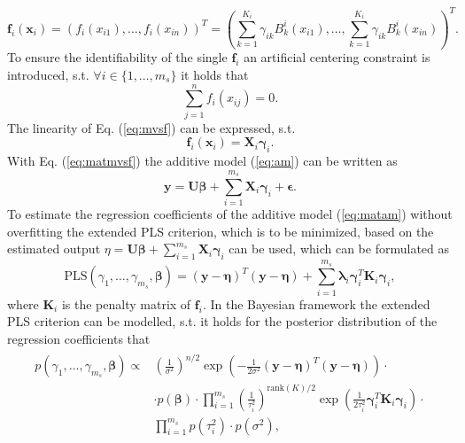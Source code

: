 \documentclass[12pt,letterpaper]{article}
\begin{document}
\begin{equation}
\mathbf{f}_i(\mathbf{x}_i) = (f_i(x_{i1}),\dots,f_i(x_{in}))^T = (\sum^{K_i}_{k=1}\gamma_{ik} B^i_k(x_{i1}),\dots,\sum^{K_i}_{k=1}\gamma_{ik} B^i_k(x_{in}))^T.
\label{eq:mvsf}
\end{equation}
To ensure the identifiability of the single $\mathbf{f}_i$ an artificial centering constraint is introduced, s.t. $\forall i \in \{1,\dots ,m_{s}\}$ it holds that
\begin{equation}
\sum^n_{j=1}f_i(x_{ij}) = 0.
\end{equation}  
The linearity of Eq. (\ref{eq:mvsf}) can be expressed, s.t. 
\begin{equation}
\mathbf{f}_i(\mathbf{x}_i) = \mathbf{X}_i\mathbf{\gamma}_i.
\label{eq:matmvsf}
\end{equation}
With Eq. (\ref{eq:matmvsf}) the additive model (\ref{eq:am}) can be written as
\begin{equation}
\mathbf{y} = \mathbf{U}\mathbf{\beta} +  \sum^{m_s}_{i=1} \mathbf{X}_i\mathbf{\gamma}_i + \mathbf{\epsilon}.
\label{eq:matam}
\end{equation}
To estimate the regression coefficients of the additive model (\ref{eq:matam}) without overfitting the extended PLS criterion, which is to be minimized, based on the estimated output $\eta = \mathbf{U}\mathbf{\beta} +  \sum^{m_s}_{i=1} \mathbf{X}_i\mathbf{\gamma}_i$
can be used, which can be formulated as
\begin{equation}
\text{PLS}(\gamma_1,\dots ,\gamma_{m_s},\mathbf{\beta}) = (\mathbf{y} - \mathbf{\eta})^T(\mathbf{y} - \mathbf{\eta}) + \sum^{m_s}_{i=1} \mathbf{\lambda}_i\mathbf{\gamma}_i^T\mathbf{K}_i\mathbf{\gamma}_i,
\end{equation}
where $\mathbf{K}_i$ is the penalty matrix of $\mathbf{f}_i$. In the Bayesian framework the extended PLS criterion can be modelled, s.t. it holds for the posterior distribution of the regression coefficients that 
\begin{align}
\begin{split}
p(\gamma_1,\dots ,\gamma_{m_s},\mathbf{\beta}) \propto &
(\frac{1}{\sigma^2})^{n/2}\exp(-\frac{1}{2\sigma^2}(\mathbf{y} - \mathbf{\eta})^T(\mathbf{y} - \mathbf{\eta})) \cdot \\
& \cdot p(\mathbf{\beta}) \cdot \prod^{m_s}_{i=1}(\frac{1}{\tau^2_i})^{\text{rank}(K)/2}\exp(\frac{1}{2\tau_i^2}\mathbf{\gamma}_i^T\mathbf{K}_i\mathbf{\gamma}_i) \cdot \\
& \prod^{m_s}_{i=1}  p(\tau^2_i)  \cdot  p(\sigma^2),
\end{split}
\end{align}
\end{document}
